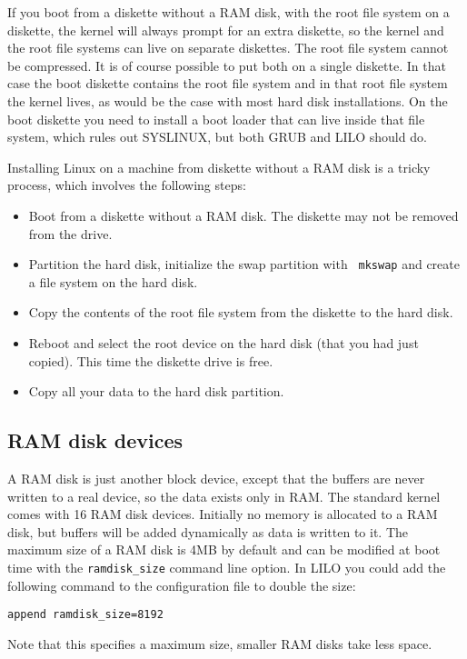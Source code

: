 \documentclass[12pt,a4paper]{article}
\begin{document}
If you boot from a diskette without a RAM disk, with the root file
system on a diskette, the kernel will always prompt for an extra
diskette, so the kernel and the root file systems can live on separate
diskettes. The root file system cannot be compressed. It is of course
possible to put both on a single diskette. In that case
the boot diskette contains the root file system and in that root file
system the kernel lives, as would be the case with most hard disk
installations. On the boot diskette you need to install a boot loader
that can live inside that file system, which rules out SYSLINUX, but
both GRUB and LILO should do.

Installing Linux on a machine from diskette without a RAM disk is a
tricky process, which involves the following steps:
\begin{itemize}
\item Boot from a diskette without a RAM disk. The diskette may not be
  removed from the drive.
\item Partition the hard disk, initialize the swap partition with {\tt
  mkswap} and create a file system on the hard disk.
\item Copy the contents of the root file system from the diskette to
  the hard disk.
\item Reboot and select the root device on the hard disk (that you had
  just copied). This time the diskette drive is free.
\item Copy all your data to the hard disk partition.
\end{itemize}


\subsection{RAM disk devices}

A RAM disk is just another block device, except that the buffers are
never written to a real device, so the data exists only in RAM. The
standard kernel comes with 16 RAM disk devices. Initially no memory is
allocated to a RAM disk, but buffers will be added dynamically as data
is written to it. The maximum size of a RAM disk is 4MB by default and
can be modified at boot time with the {\tt ramdisk\_size} command line
option. In LILO you could add the following command to the
configuration file to double the size:
\begin{verbatim}
append ramdisk_size=8192
\end{verbatim}
Note that this specifies a maximum size, smaller RAM disks take less space.
\end{document}

